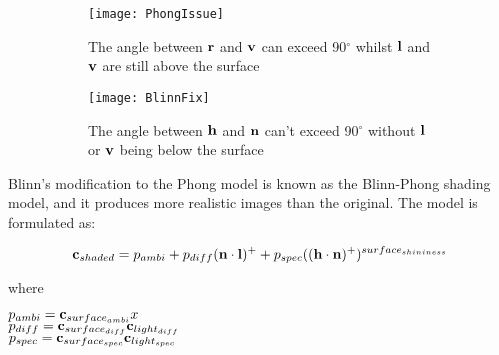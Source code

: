 \begin{figure}[h]
	\begin{subfigure}{0.48\textwidth}
		\texttt{[image: PhongIssue]}
		\caption{The angle between \begin{math}\mathbf{r}\end{math} and \begin{math}\mathbf{v}\end{math} can exceed 90$^{\circ}$ whilst \begin{math}\mathbf{l}\end{math} and \begin{math}\mathbf{v}\end{math} are still above the surface}
		\label{fig:PhongIssue}
	\end{subfigure}
	\hspace*{\fill}
	\begin{subfigure}{0.48\textwidth}
		\texttt{[image: BlinnFix]}
		\caption{The angle between \begin{math}\mathbf{h}\end{math} and \begin{math}\mathbf{n}\end{math} can't exceed 90$^{\circ}$ without \begin{math}\mathbf{l}\end{math} or \begin{math}\mathbf{v}\end{math} being below the surface }
		\label{fig:BlinnFix}
	\end{subfigure}
	\caption{}
\end{figure}

Blinn's modification to the Phong model is known as the Blinn-Phong shading model, and it produces more realistic images than the original. The model is formulated as:

\begin{equation} \label{eq:BlinnPhong}
	\mathbf{c}_{shaded} = p_{ambi} + p_{diff}(\mathbf{n}\cdot\mathbf{l})^+ + p_{spec}((\mathbf{h}\cdot\mathbf{n})^+)^{surface_{shininess}}
\end{equation}

where

\begin{center}
	\begin{math}p_{ambi} = \mathbf{c}_{surface_{ambi}}x\end{math} \\
	\begin{math}p_{diff} = \mathbf{c}_{surface_{diff}}\mathbf{c}_{light_{diff}}\end{math} \\
	\begin{math}p_{spec} = \mathbf{c}_{surface_{spec}}\mathbf{c}_{light_{spec}}\end{math}
\end{center}

